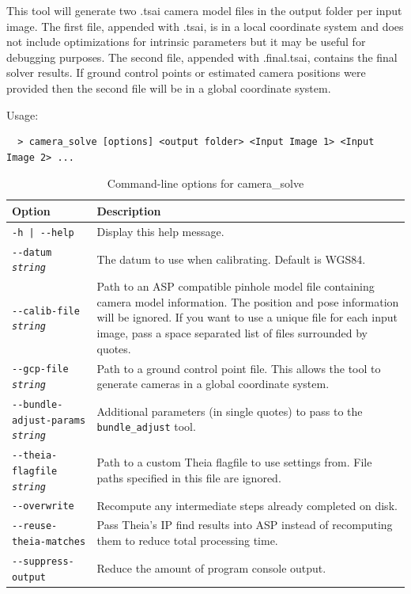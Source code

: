 This tool will generate two .tsai camera model files in the output folder per input image.
The first file, appended with .tsai, is in a local coordinate system and does not include
optimizations for intrinsic parameters but it may be useful for debugging purposes.
The second file, appended with .final.tsai, contains the final solver results.  If ground control points or
estimated camera positions were provided then the second file will be in a global coordinate system.


Usage:
\begin{verbatim}
  > camera_solve [options] <output folder> <Input Image 1> <Input Image 2> ...
\end{verbatim}

\begin{longtable}{|l|p{7.5cm}|}
\caption{Command-line options for camera\_solve}
\label{tbl:camerasolve}
\endfirsthead
\endhead
\endfoot
\endlastfoot
\hline
Option & Description \\ \hline \hline
\texttt{-h | -\/-help } & Display this help message.\\ \hline
\texttt{-\/-datum  \textit{string}} & The datum to use when calibrating.  Default is WGS84.\\ \hline
\texttt{-\/-calib-file  \textit{string}} & Path to an ASP compatible pinhole model file containing 
camera model information. The position and pose information will be ignored. If you want 
to use a unique file for each input image, pass a space separated list of files surrounded by quotes.\\ \hline
\texttt{-\/-gcp-file  \textit{string}} & Path to a ground control point file.  This allows
the tool to generate cameras in a global coordinate system.\\ \hline
\texttt{-\/-bundle-adjust-params  \textit{string}} & Additional parameters (in single quotes)
to pass to the \texttt{bundle\_adjust} tool.\\ \hline
\texttt{-\/-theia-flagfile  \textit{string}} & Path to a custom Theia flagfile to use settings from.
File paths specified in this file are ignored.\\ \hline
\texttt{-\/-overwrite}  & Recompute any intermediate steps already completed on disk.\\ \hline
\texttt{-\/-reuse-theia-matches}  & Pass Theia's IP find results into ASP instead of recomputing 
them to reduce total processing time.\\ \hline
\texttt{-\/-suppress-output} & Reduce the amount of program console output.\\ \hline
\end{longtable}

